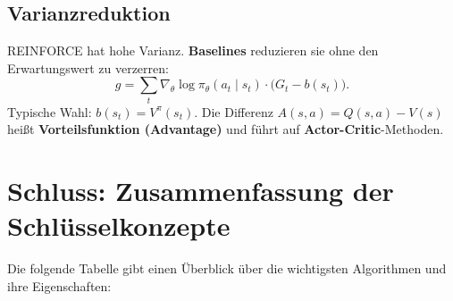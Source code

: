 \documentclass[11pt]{article}
\theoremstyle{csthm}
\theoremstyle{csdef}
\begin{document}
\subsection{Varianzreduktion}

REINFORCE hat hohe Varianz. \textbf{Baselines} reduzieren sie ohne den
Erwartungswert zu verzerren:
\begin{equation}
  g = \sum_t \nabla_\theta \log\pi_\theta(a_t \mid s_t)
    \cdot \bigl(G_t - b(s_t)\bigr).
\end{equation}
Typische Wahl: $b(s_t) = V^\pi(s_t)$. Die Differenz
$A(s,a) = Q(s,a) - V(s)$ heißt \textbf{Vorteilsfunktion (Advantage)} und
führt auf \textbf{Actor-Critic}-Methoden.

\newpage
\section*{Schluss: Zusammenfassung der Schlüsselkonzepte}


Die folgende Tabelle gibt einen Überblick über die wichtigsten Algorithmen
und ihre Eigenschaften:
\end{document}
